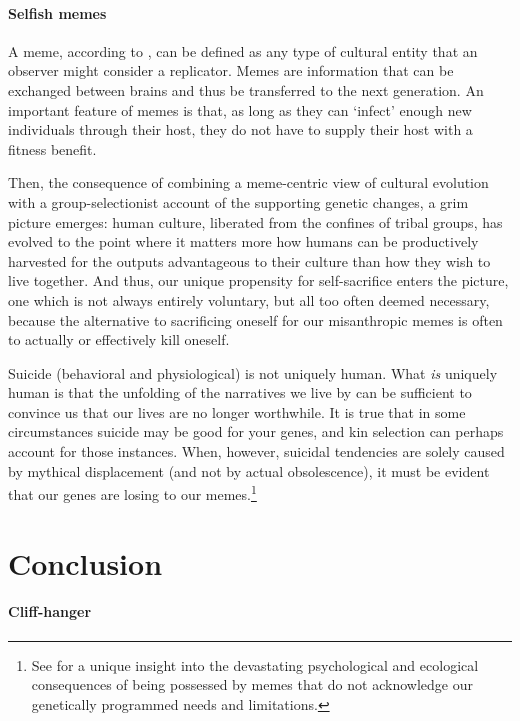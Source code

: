 \documentclass{article}
\begin{document}
\paragraph{Selfish memes}

A meme, according to \citet{dawkins1976}, can be defined as any type of
cultural entity that an observer might consider a replicator.  Memes are
information that can be exchanged between brains and thus be transferred to the
next generation. An important feature of memes is that, as long as they can
‘infect’ enough new individuals through their host, they do not have to supply
their host with a fitness benefit.

Then, the consequence of combining a meme-centric view of cultural evolution
with a group-selectionist account of the supporting genetic changes, a grim
picture emerges: human culture, liberated from the confines of tribal
groups, has evolved to the point where it matters more how humans can be
productively harvested for the outputs advantageous to their culture than how
they wish to live together. And thus, our unique propensity for self-sacrifice
enters the picture, one which is not always entirely voluntary, but all too
often deemed necessary, because the alternative to sacrificing oneself for our
misanthropic memes is often to actually or effectively kill oneself.

Suicide (behavioral and physiological) is not uniquely human. What \emph{is}
uniquely human is that the unfolding of the narratives we live by can be
sufficient to convince us that our lives are no longer worthwhile. It is true
that in some circumstances suicide may be good for your genes, and kin
selection can perhaps account for those instances. When, however, suicidal
tendencies are solely caused by mythical displacement (and not by actual
obsolescence), it must be evident that our genes are losing to our
memes.\footnote{See \citet{quinn1992} for a unique insight into the devastating
psychological and ecological consequences of being possessed by memes that do
not acknowledge our genetically programmed needs and limitations.}


\section{Conclusion}

\paragraph{Cliff-hanger}
\end{document}
